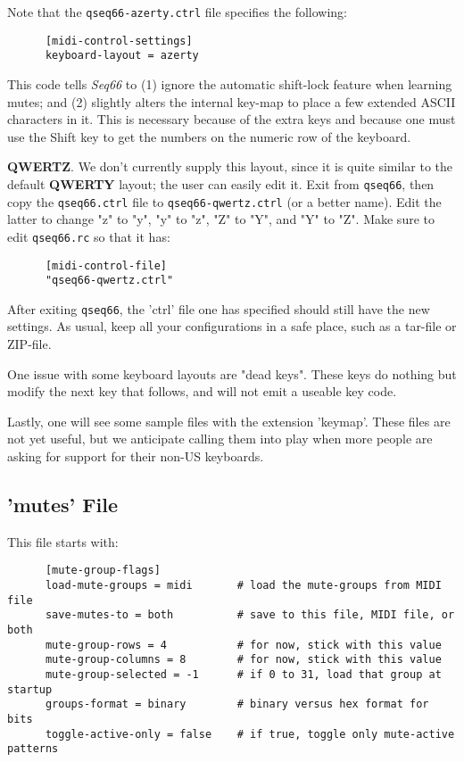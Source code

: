    Note that the \texttt{qseq66-azerty.ctrl} file specifies the following:

   \begin{verbatim}
      [midi-control-settings]
      keyboard-layout = azerty
   \end{verbatim}

   This code tells \textsl{Seq66} to (1) ignore the automatic shift-lock
   feature when learning mutes; and (2) slightly alters the internal key-map to
   place a few extended ASCII characters in it.  This is necessary because of
   the extra keys and because one must use the Shift key to get the numbers on
   the numeric row of the keyboard.

   \textbf{QWERTZ}.
   We don't currently supply this layout, since it is quite similar to the
   default \textbf{QWERTY} layout; the user can easily edit it.
   Exit from \texttt{qseq66}, then copy the \texttt{qseq66.ctrl}
   file to \texttt{qseq66-qwertz.ctrl} (or a better name).  Edit the latter to
   change "z" to "y", "y" to "z", "Z" to "Y", and "Y" to "Z".
   Make sure to edit \texttt{qseq66.rc} so that it has:

   \begin{verbatim}
      [midi-control-file]
      "qseq66-qwertz.ctrl"
   \end{verbatim}

   After exiting \texttt{qseq66}, the 'ctrl' file one has specified
   should still have the new settings.
   As usual, keep all your configurations in a safe place, such as a tar-file or
   ZIP-file.

   One issue with some keyboard layouts are "dead keys".  These keys do
   nothing but modify the next key that follows, and will not emit
   a useable key code.

   Lastly, one will see some sample files with the extension 'keymap'.
   These files are not yet useful, but we anticipate calling them into play
   when more people are asking for support for their non-US keyboards.

\subsection{'mutes' File}
\label{subsubsec:configuration_mute_group_control}

   This file starts with:

   \begin{verbatim}
      [mute-group-flags]
      load-mute-groups = midi       # load the mute-groups from MIDI file
      save-mutes-to = both          # save to this file, MIDI file, or both
      mute-group-rows = 4           # for now, stick with this value
      mute-group-columns = 8        # for now, stick with this value
      mute-group-selected = -1      # if 0 to 31, load that group at startup
      groups-format = binary        # binary versus hex format for bits
      toggle-active-only = false    # if true, toggle only mute-active patterns
   \end{verbatim}

